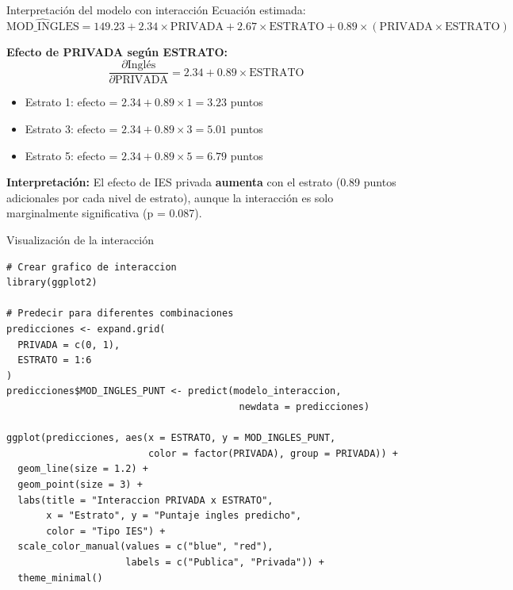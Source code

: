 \documentclass[aspectratio=169, 11pt]{beamer}
\begin{document}
\begin{frame}{Interpretación del modelo con interacción}
Ecuación estimada:
\[
\widehat{\text{MOD\_INGLES}} = 149.23 + 2.34 \times \text{PRIVADA} + 2.67 \times \text{ESTRATO} + 0.89 \times (\text{PRIVADA} \times \text{ESTRATO})
\]

\vspace{0.2cm}
\textbf{Efecto de PRIVADA según ESTRATO:}
\[
\frac{\partial \text{Inglés}}{\partial \text{PRIVADA}} = 2.34 + 0.89 \times \text{ESTRATO}
\]

\begin{itemize}
  \item Estrato 1: efecto = $2.34 + 0.89 \times 1 = 3.23$ puntos
  \item Estrato 3: efecto = $2.34 + 0.89 \times 3 = 5.01$ puntos
  \item Estrato 5: efecto = $2.34 + 0.89 \times 5 = 6.79$ puntos
\end{itemize}

\vspace{0.2cm}
\textbf{Interpretación:} El efecto de IES privada \textbf{aumenta} con el estrato (0.89 puntos adicionales por cada nivel de estrato), aunque la interacción es solo marginalmente significativa (p = 0.087).
\end{frame}

\begin{frame}[fragile]{Visualizaci\'on de la interacci\'on}
\begin{lstlisting}[basicstyle=\ttfamily\scriptsize]
# Crear grafico de interaccion
library(ggplot2)

# Predecir para diferentes combinaciones
predicciones <- expand.grid(
  PRIVADA = c(0, 1),
  ESTRATO = 1:6
)
predicciones$MOD_INGLES_PUNT <- predict(modelo_interaccion,
                                         newdata = predicciones)

ggplot(predicciones, aes(x = ESTRATO, y = MOD_INGLES_PUNT,
                         color = factor(PRIVADA), group = PRIVADA)) +
  geom_line(size = 1.2) +
  geom_point(size = 3) +
  labs(title = "Interaccion PRIVADA x ESTRATO",
       x = "Estrato", y = "Puntaje ingles predicho",
       color = "Tipo IES") +
  scale_color_manual(values = c("blue", "red"),
                     labels = c("Publica", "Privada")) +
  theme_minimal()
\end{lstlisting}
\end{frame}
\end{document}

